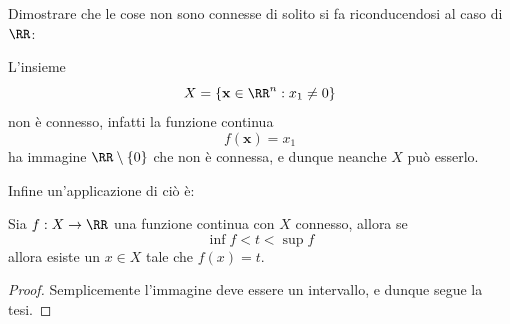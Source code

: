 \documentclass[11pt]{scrartcl}
\begin{document}
	Dimostrare che le cose non sono connesse di solito si fa riconducendosi al caso di $\RR$:
	\begin{example}
		L'insieme 
		$$X=\left\{\mathbf{x}\in \RR^n:x_1\ne 0\right\}$$
		non è connesso, infatti la funzione continua
		$$f(\mathbf{x})=x_1$$
		ha immagine $\RR\setminus\left\{0\right\}$ che non è connessa, e dunque neanche $X$ può esserlo.
	\end{example}
	Infine un'applicazione di ciò è:
	\begin{corollary}
		Sia $f:X\to \RR$ una funzione continua con $X$ connesso, allora se 
		$$\inf f<t<\sup f$$
		allora esiste un $x\in X$ tale che $f(x)=t$. 
	\end{corollary}
	\begin{proof}
		Semplicemente l'immagine deve essere un intervallo, e dunque segue la tesi.
	\end{proof}
\end{document}
